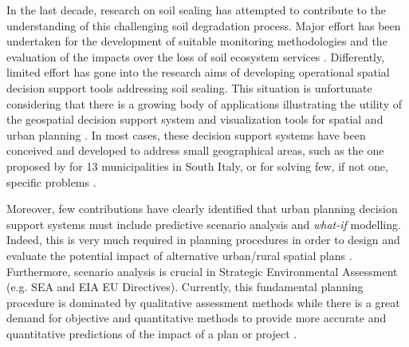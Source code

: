 \documentclass[APA,LATO1COL,doublespace]{WileyNJD-v2}
\begin{document}
In the last decade, research on soil sealing has attempted to contribute to the understanding of this challenging soil degradation process. Major effort has been undertaken for the development of suitable monitoring methodologies \citep{ISPRA18,Alvarado18} and the evaluation of the impacts over the loss of soil ecosystem services \citep{Calzolari16}. Differently, limited effort has gone into the research aims of developing operational spatial decision support tools addressing soil sealing.
This situation is unfortunate considering that there is a growing body of applications illustrating the utility of the geospatial decision support system and visualization tools for spatial and urban planning  \citep[e.g.][]{Bishop98,Geertman12,Carsjens07,Malczewski04,Malczewski06,Meyer08}.
In most cases, these decision support systems have been conceived and developed to address small geographical areas, such as the one proposed by \cite{Piero17} for 13 municipalities in South Italy, or for solving few, if not one, specific problems \citep[e.g.][]{Fedra98,Meyer08,Torresan16}. %

Moreover, few contributions have clearly identified that urban planning decision support systems must include predictive scenario analysis \citep{Choi16,Xiang03,Volk10} and \textit{what-if} modelling. 
Indeed, this is very much required in planning procedures in order to design and evaluate the potential impact of alternative urban/rural spatial plans \citep{Hawkins02,Harms95,Choi16,vonHaaren06}. 
Furthermore, scenario analysis is crucial in Strategic Environmental Assessment (e.g. SEA and EIA EU Directives). Currently, this fundamental planning procedure is dominated by qualitative assessment methods while there is a great demand for objective and quantitative methods \citep{Choi16} to provide more accurate and quantitative predictions of the impact of a plan or project \citep{Carver03,Vanderhaegen05}.
\end{document}
